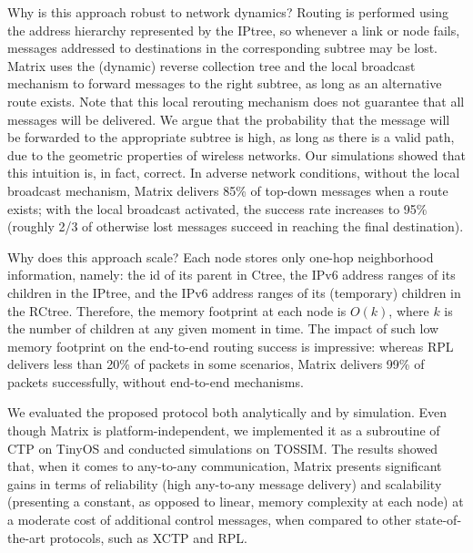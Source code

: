 Why is this approach robust to network dynamics? Routing is performed using the address hierarchy represented by the IPtree, so whenever a link or node fails, messages addressed to destinations in the corresponding subtree may be lost. Matrix uses the (dynamic) reverse collection tree and the local broadcast mechanism to forward messages to the right subtree, as long as an alternative route exists. Note that this local rerouting mechanism does not guarantee that all messages will be delivered. We argue that the probability that the message will be forwarded to the appropriate subtree is high, as long as there is a valid path, due to the geometric properties of wireless networks. Our simulations showed that this intuition is, in fact, correct. In adverse network conditions, without the local broadcast mechanism, Matrix delivers 85\% of top-down messages when a route exists; with the local broadcast activated, the success rate increases to 95\% (roughly 2/3 of otherwise lost messages succeed in reaching the final destination). 

Why does this approach scale? Each node stores only one-hop neighborhood information, namely: the id of its parent in Ctree, the IPv6 address ranges of its children in the IPtree, and the IPv6 address ranges of its (temporary) children in the RCtree. Therefore, the memory footprint at each node is $O(k)$, where $k$ is the number of children at any given moment in time. The impact of such low memory footprint on the end-to-end routing success is impressive: whereas RPL delivers less than 20\% of packets in some scenarios, Matrix delivers 99\% of packets successfully, without end-to-end mechanisms.

We evaluated the proposed protocol both analytically and by simulation. Even though Matrix is platform-independent, we implemented it as a subroutine of CTP on TinyOS and conducted simulations on TOSSIM. The results showed that, when it comes to any-to-any communication, Matrix presents significant gains in terms of reliability (high any-to-any message delivery) and scalability (presenting a constant, as opposed to linear, memory complexity at each node) at a moderate cost of additional control messages, when compared to other state-of-the-art protocols, such as XCTP and RPL.

